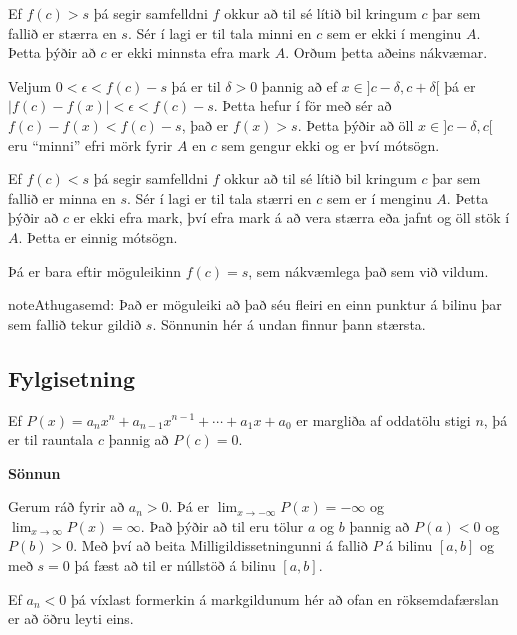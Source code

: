 \documentclass[a4paper,10pt,icelandic]{sphinxmanual}
\begin{document}
Ef \(f(c)>s\) þá segir samfelldni \(f\)
okkur að til sé lítið bil kringum \(c\) þar sem fallið er stærra en \(s\). Sér í lagi er
til tala minni en \(c\) sem er ekki í menginu \(A\). Þetta þýðir að \(c\) er
ekki minnsta efra mark \(A\). Orðum þetta aðeins nákvæmar.

Veljum \(0<\epsilon < f(c)-s\) þá er til \(\delta>0\) þannig að ef \(x\in ]c-\delta,c+\delta[\)
þá er \(|f(c)-f(x)|<\epsilon < f(c) -s\). Þetta hefur í för með sér að \(f(c) - f(x) < f(c) -s\),
það er \(f(x)>s\). Þetta þýðir að öll \(x\in]c-\delta,c[\) eru ``minni'' efri mörk fyrir \(A\)
en \(c\) sem gengur ekki og er því mótsögn.

Ef \(f(c)<s\) þá segir samfelldni \(f\) okkur að til sé lítið bil kringum \(c\)
þar sem fallið er minna en \(s\). Sér í lagi  er til tala stærri en \(c\) sem er í menginu
\(A\). Þetta þýðir að \(c\) er ekki efra mark, því efra mark á að vera stærra eða jafnt
og öll stök í \(A\). Þetta er einnig mótsögn.

Þá er bara eftir möguleikinn \(f(c)=s\), sem nákvæmlega það sem við vildum.

\begin{notice}{note}{Athugasemd:}
Það er möguleiki að það séu fleiri en einn punktur á bilinu þar sem fallið tekur
gildið \(s\). Sönnunin hér á undan finnur þann stærsta.
\end{notice}


\subsection{Fylgisetning}
\label{kafli02:fylgisetning}
Ef \(P(x)=a_nx^n+a_{n-1}x^{n-1}+\cdots+a_1x+a_0\) er margliða af
oddatölu stigi \(n\), þá er til rauntala \(c\) þannig að \(P(c)=0\).

\textbf{Sönnun}

Gerum ráð fyrir að \(a_n>0\). Þá er
\(\lim_{x\to -\infty} P(x) = -\infty\) og
\(\lim_{x\to \infty} P(x) = \infty\). Það þýðir að til eru tölur
\(a\) og \(b\) þannig að \(P(a)<0\) og \(P(b)>0\). Með
því að beita Milligildissetningunni á fallið \(P\) á bilinu
\([a,b]\) og með \(s=0\) þá fæst að til er núllstöð á bilinu
\([a,b]\).

Ef \(a_n < 0\) þá víxlast formerkin á markgildunum hér að ofan en röksemdafærslan er
að öðru leyti eins.
\end{document}
